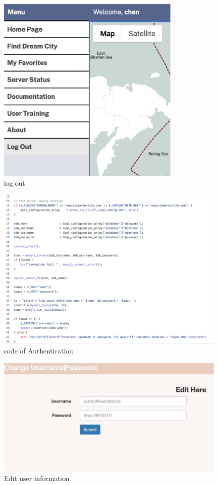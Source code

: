 \documentclass[12pt, letterpaper]{article}
\begin{document}
\begin{figure}[htbp]
	\centering
	\includegraphics[width=3.5in]{images/q5_2.png}
	\caption{log out}
 \end{figure}
 \newpage
 
 \begin{figure}[htbp]
	\centering
	\includegraphics[width=6in]{images/q5_5.png}
	\caption{code of Authentication}
 \end{figure}
 \newpage
 
 \begin{figure}[htbp]
	\centering
	\includegraphics[width=5in]{images/q5_3.jpg}
	\caption{Edit user information}
 \end{figure}
 
\end{document}
